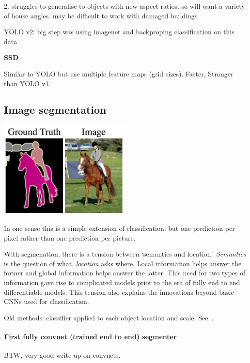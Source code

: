 \documentclass[12pt, a4paper, oneside, headinclude, footinclude]{article}
\begin{document}
2. struggles to generalise to objects with new aspect ratios. so will want a
variety of house angles. may be difficult to work with damaged buildings 

YOLO v2: big step was using imagenet and backproping classification on this
data

\textbf{SSD}~\cite{liu2016ssd}

Similar to YOLO but use multiple feature maps (grid sizes). Faster, Stronger
than YOLO v1.

\subsection{Image segmentation}

\includegraphics[width=0.5\textwidth]{Figures/segmentation-example.png}

In one sense this is a simple extension of classification: but one prediction
per pixel rather than one prediction per picture.

With segmenation, there is a tension between `semantics and location.'
\textit{Semantics} is the question of what, \textit{location} asks where.
Local information helps answer the former and global information helps answer
the latter. This need for two types of information gave rise to complicated
models prior to the era of fully end to end differentiable models. This
tension also explains the innovations beyond basic CNNs used for
classification.

Old methods: classifier applied to each object location and scale.
See~\cite{NIPS2015_5852}.

\paragraph{First fully convnet (trained end to end) segmenter}

BTW, very good write up on convnets.~\cite{long2015fully}
\end{document}
